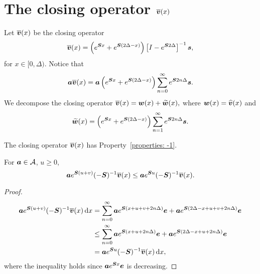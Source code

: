 
\section{The closing operator \(\overline{\boldsymbol v} (x)\)}%

Let \(\overline{\boldsymbol v} (x)\) be the closing operator 
\[\overline{\boldsymbol v}(x) = \left(e^{\boldsymbol{S}x} + e^{\boldsymbol{S}(2\Delta-x)}\right)\left[I-e^{\boldsymbol S 2\Delta}\right]^{-1}\boldsymbol s,\]
for \(x\in[0,\Delta)\).
Notice that 
\[\boldsymbol a \overline{\boldsymbol v}(x) = \boldsymbol a \left(e^{\boldsymbol{S}x} + e^{\boldsymbol{S}(2\Delta-x)}\right)\sum_{n=0}^\infty e^{\boldsymbol S2n\Delta}\boldsymbol s.\]
We decompose the closing operator \(\displaystyle \overline{\boldsymbol v}(x)=\boldsymbol w(x)+\widetilde{\boldsymbol w}(x),\) where \(\boldsymbol w(x) = \widehat{\boldsymbol v}(x)\) and 
\[\widetilde{\boldsymbol w}(x) = \left(e^{\boldsymbol{S}x} + e^{\boldsymbol{S}(2\Delta-x)}\right)\sum_{n=1}^\infty e^{\boldsymbol S2n\Delta}\boldsymbol s.\]

\begin{lem}
	The closing operator \(\overline{\boldsymbol v}(x)\) has Property~\ref{properties: -1}.
	
	For \(\boldsymbol a \in\mathcal A\), \(u\geq 0\), 
	\[\boldsymbol a e^{\boldsymbol S(u+v)}(-\boldsymbol S)^{-1}\overline{\boldsymbol v}(x) \leq \boldsymbol a e^{\boldsymbol Su}(-\boldsymbol S)^{-1}\overline{\boldsymbol v}(x) . \]
\end{lem}
\begin{proof}
	\begin{align*}
		 \boldsymbol a e^{\boldsymbol S(u+v)}(-\boldsymbol S)^{-1}\overline{\boldsymbol v}(x)\, \mathrm{d} x &= \sum_{n=0}^\infty\boldsymbol a e^{\boldsymbol S(x+u+v+2n\Delta)}\boldsymbol e + \boldsymbol a  e^{\boldsymbol S(2\Delta-x + u + v + 2n\Delta)} \boldsymbol e
		\\ &\leq \sum_{n=0}^\infty \boldsymbol a e^{\boldsymbol S(x+u+2n\Delta)}\boldsymbol e + \boldsymbol a  e^{\boldsymbol S(2\Delta-x + u + 2n\Delta)} \boldsymbol e
		\\ &= \boldsymbol a e^{\boldsymbol Su}(-\boldsymbol S)^{-1}\overline{\boldsymbol v}(x)\, \mathrm{d} x,
	\end{align*}
	where the inequality holds since \(\boldsymbol ae^{\boldsymbol Sx}\boldsymbol e\) is decreasing.
\end{proof}

